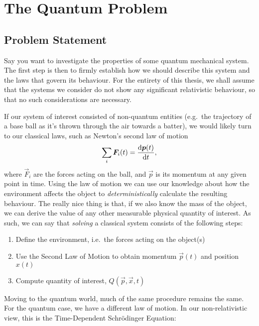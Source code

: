 \documentclass[Thesis.tex]{subfiles}
\begin{document}
\chapter{The Quantum Problem}
\label{chp:the-quantum-problem}


\section{Problem Statement}

Say you want to investigate the properties of some quantum
mechanical system. The first step is then to firmly establish how we should describe this
system and the laws that govern its behaviour. For the entirety of this thesis, we shall
assume that the systems we consider do not show any significant relativistic behaviour, so
that no such considerations are necessary.

If our system of interest consisted of non-quantum entities (e.g.\ the
trajectory of a base ball as it's thrown through the air towards a batter), we
would likely turn to our classical laws, such as Newton's second law of motion
%
\begin{align}
    \sum_i \bm{F}_i(t) = \dv{\bm{p}(t)}{t},
\end{align}
%
\noindent where $\vec F_i$ are the forces acting on the ball, and $\vec p$ is its momentum at
any given point in time. Using the law of motion we can use our knowledge about how the
environment affects the object to \emph{deterministically} calculate the resulting
behaviour. The really nice thing is that, if we also know the mass of the object, we
can derive the value of any other measurable physical quantity of interest. As such,
we can say that \emph{solving} a classical system consists of the following steps:

\begin{enumerate}
    \item Define the environment, i.e.\ the forces acting on the object(s)
    \item Use the Second Law of Motion to obtain momentum $\vec p(t)$ and position $x(t)$
    \item Compute quantity of interest, $Q(\vec p, \vec x, t)$
\end{enumerate}

Moving to the quantum world, much of the same procedure remains the same. For the quantum
case, we have a different law of motion. In our non-relativistic view, this is the
Time-Dependent Schrödinger Equation:
\end{document}
